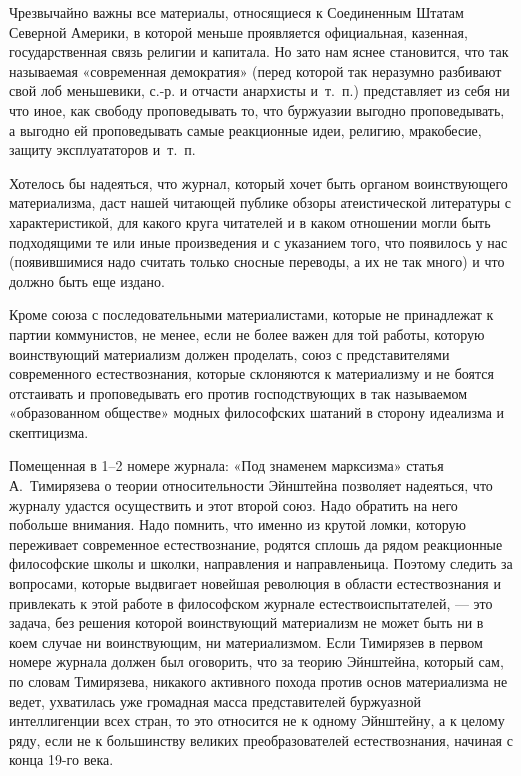 Чрезвычайно важны все материалы, относящиеся к Соединенным Штатам Северной
Америки, в которой меньше проявляется официальная, казенная,
государственная связь религии и капитала. Но зато нам яснее становится, что
так называемая «современная демократия» (перед которой так неразумно
разбивают свой лоб меньшевики, с.-р. и отчасти анархисты и~т.~п.)
представляет из себя ни что иное, как свободу проповедывать то, что
буржуазии выгодно проповедывать, а выгодно ей проповедывать самые
реакционные идеи, религию, мракобесие, защиту эксплуататоров и~т.~п.

Хотелось бы надеяться, что журнал, который хочет быть органом воинствующего
материализма, даст нашей читающей публике обзоры атеистической литературы с
характеристикой, для какого круга читателей и в каком отношении могли быть
подходящими те или иные произведения и с указанием того, что появилось у
нас (появившимися надо считать только сносные переводы, а их не так много)
и что должно быть еще издано.

Кроме союза с последовательными материалистами, которые не принадлежат к
партии коммунистов, не менее, если не более важен для той работы, которую
воинствующий материализм должен проделать, союз с представителями
современного естествознания, которые склоняются к материализму и не боятся
отстаивать и проповедывать его против господствующих в так называемом
«образованном обществе» модных философских шатаний в сторону идеализма и
скептицизма.

Помещенная в 1–2 номере журнала: «Под знаменем марксизма» статья
А.~Тимирязева о теории относительности Эйнштейна
позволяет надеяться, что журналу удастся осуществить и этот второй союз.
Надо обратить на него побольше внимания. Надо помнить, что именно из крутой
ломки, которую переживает современное естествознание, родятся сплошь да
рядом реакционные философские школы и школки, направления и направленьица.
Поэтому следить за вопросами, которые выдвигает новейшая революция в
области естествознания и привлекать к этой работе в философском журнале
естествоиспытателей, — это задача, без решения которой воинствующий
материализм не может быть ни в коем случае ни воинствующим, ни
материализмом. Если Тимирязев в первом номере журнала должен был оговорить,
что за теорию Эйнштейна, который сам, по словам Тимирязева, никакого
активного похода против основ материализма не ведет, ухватилась уже
громадная масса представителей буржуазной интеллигенции всех стран, то это
относится не к одному Эйнштейну, а к целому ряду, если не к большинству
великих преобразователей естествознания, начиная с конца 19-го века.

